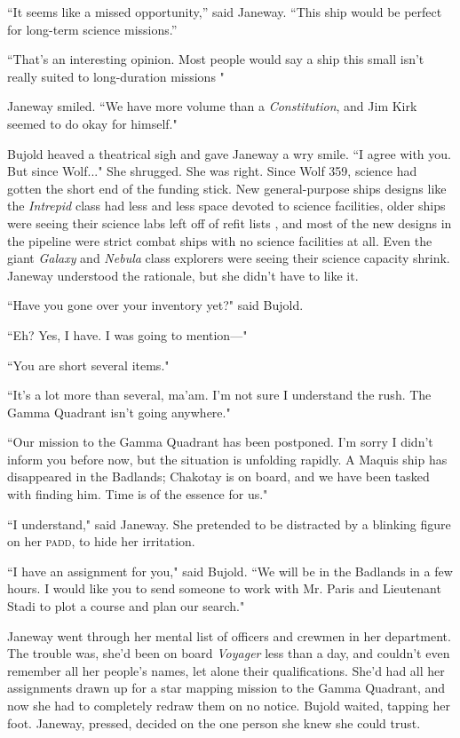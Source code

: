 \documentclass[twoside,letterpaper,12pt]{memoir}
\begin{document}
``It seems like a missed opportunity,'' said Janeway. ``This ship would be perfect for long-term science missions.''

``That’s an interesting opinion. Most people would say a ship this small isn't really suited to long-duration missions "

Janeway smiled. ``We have more volume than a \textit{Constitution}, and Jim Kirk seemed to do okay for himself."

Bujold heaved a theatrical sigh and gave Janeway a wry smile. ``I agree with you. But since Wolf..." She shrugged. She was right. Since Wolf 359, science had gotten the short end of the funding stick. New general-purpose ships designs like the \textit{Intrepid }class had less and less space devoted to science facilities, older ships were seeing their science labs left off of refit lists , and most of the new designs in the pipeline were strict combat ships with no science facilities at all. Even the giant \textit{Galaxy} and \textit{Nebula} class explorers were seeing their science capacity shrink. Janeway understood the rationale, but she didn't have to like it.

``Have you gone over your inventory yet?" said Bujold.

``Eh? Yes, I have. I was going to mention---"

``You are short several items."

``It's a lot more than several, ma'am. I'm not sure I understand the rush. The Gamma Quadrant isn't going anywhere."

``Our mission to the Gamma Quadrant has been postponed. I'm sorry I didn't inform you before now, but the situation is unfolding rapidly. A Maquis ship has disappeared in the Badlands; Chakotay is on board, and we have been tasked with finding him. Time is of the essence for us."

``I understand," said Janeway. She pretended to be distracted by a blinking figure on her \textsc{padd}, to hide her irritation.

``I have an assignment for you," said Bujold. ``We will be in the Badlands in a few hours. I would like you to send someone to work with Mr. Paris and Lieutenant Stadi to plot a course and plan our search."

Janeway went through her mental list of officers and crewmen in her department. The trouble was, she'd been on board \textit{Voyager} less than a day, and couldn't even remember all her people's names, let alone their qualifications. She'd had all her assignments drawn up for a star mapping mission to the Gamma Quadrant, and now she had to completely redraw them on no notice. Bujold waited, tapping her foot. Janeway, pressed, decided on the one person she knew she could trust.
\end{document}

